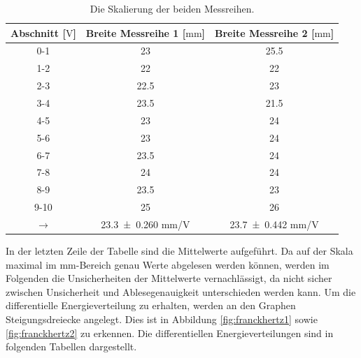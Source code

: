 \begin{table}[H]
  \centering
  \caption{Die Skalierung der beiden Messreihen.}
  \label{tab:skalierungausw}
    \begin{tabular}{S S S}
      \toprule
      {Abschnitt [$\si{\volt}$]} & {Breite Messreihe 1 [$\si{\milli\meter}$]} & {Breite Messreihe 2 [$\si{\milli\meter}$]} \\
      \midrule
      {0-1}  &  23   & 25.5  \\
      {1-2}  &  22   & 22  \\
      {2-3}  &  22.5 & 23  \\
      {3-4}  &  23.5 & 21.5  \\
      {4-5}  &  23   & 24  \\
      {5-6}  &  23   & 24  \\
      {6-7}  &  23.5 & 24  \\
      {7-8}  &  24   & 24  \\
      {8-9}  &  23.5 & 23  \\
      {9-10} &  25   & 26  \\
      {$\rightarrow$} & \num{23.3 \pm 0.260} mm/V  & \num{23.7 \pm 0.442} mm/V \\
      \bottomrule
    \end{tabular}
  \end{table}
\noindent
In der letzten Zeile der Tabelle sind die Mittelwerte aufgeführt. Da auf der Skala maximal im
$\si{\milli\meter}$-Bereich genau Werte abgelesen
werden können, werden im Folgenden die Unsicherheiten der Mittelwerte vernachlässigt, da nicht sicher
zwischen Unsicherheit und Ablesegenauigkeit unterschieden werden kann.
Um die differentielle Energieverteilung zu erhalten, werden an den Graphen
Steigungsdreiecke angelegt. Dies ist in Abbildung \ref{fig:franckhertz1}
sowie \ref{fig:franckhertz2} zu erkennen.
Die differentiellen Energieverteilungen sind in folgenden Tabellen dargestellt.


